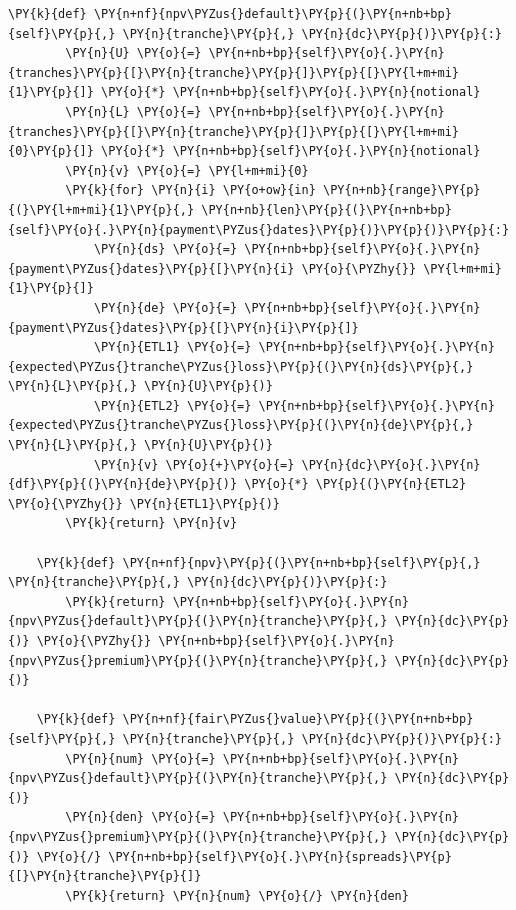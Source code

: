 \begin{codebox}
\begin{Verbatim}[commandchars=\\\{\}]
    \PY{k}{def} \PY{n+nf}{npv\PYZus{}default}\PY{p}{(}\PY{n+nb+bp}{self}\PY{p}{,} \PY{n}{tranche}\PY{p}{,} \PY{n}{dc}\PY{p}{)}\PY{p}{:}
        \PY{n}{U} \PY{o}{=} \PY{n+nb+bp}{self}\PY{o}{.}\PY{n}{tranches}\PY{p}{[}\PY{n}{tranche}\PY{p}{]}\PY{p}{[}\PY{l+m+mi}{1}\PY{p}{]} \PY{o}{*} \PY{n+nb+bp}{self}\PY{o}{.}\PY{n}{notional}
        \PY{n}{L} \PY{o}{=} \PY{n+nb+bp}{self}\PY{o}{.}\PY{n}{tranches}\PY{p}{[}\PY{n}{tranche}\PY{p}{]}\PY{p}{[}\PY{l+m+mi}{0}\PY{p}{]} \PY{o}{*} \PY{n+nb+bp}{self}\PY{o}{.}\PY{n}{notional}
        \PY{n}{v} \PY{o}{=} \PY{l+m+mi}{0}
        \PY{k}{for} \PY{n}{i} \PY{o+ow}{in} \PY{n+nb}{range}\PY{p}{(}\PY{l+m+mi}{1}\PY{p}{,} \PY{n+nb}{len}\PY{p}{(}\PY{n+nb+bp}{self}\PY{o}{.}\PY{n}{payment\PYZus{}dates}\PY{p}{)}\PY{p}{)}\PY{p}{:}
            \PY{n}{ds} \PY{o}{=} \PY{n+nb+bp}{self}\PY{o}{.}\PY{n}{payment\PYZus{}dates}\PY{p}{[}\PY{n}{i} \PY{o}{\PYZhy{}} \PY{l+m+mi}{1}\PY{p}{]} 
            \PY{n}{de} \PY{o}{=} \PY{n+nb+bp}{self}\PY{o}{.}\PY{n}{payment\PYZus{}dates}\PY{p}{[}\PY{n}{i}\PY{p}{]}
            \PY{n}{ETL1} \PY{o}{=} \PY{n+nb+bp}{self}\PY{o}{.}\PY{n}{expected\PYZus{}tranche\PYZus{}loss}\PY{p}{(}\PY{n}{ds}\PY{p}{,} \PY{n}{L}\PY{p}{,} \PY{n}{U}\PY{p}{)}
            \PY{n}{ETL2} \PY{o}{=} \PY{n+nb+bp}{self}\PY{o}{.}\PY{n}{expected\PYZus{}tranche\PYZus{}loss}\PY{p}{(}\PY{n}{de}\PY{p}{,} \PY{n}{L}\PY{p}{,} \PY{n}{U}\PY{p}{)}
            \PY{n}{v} \PY{o}{+}\PY{o}{=} \PY{n}{dc}\PY{o}{.}\PY{n}{df}\PY{p}{(}\PY{n}{de}\PY{p}{)} \PY{o}{*} \PY{p}{(}\PY{n}{ETL2} \PY{o}{\PYZhy{}} \PY{n}{ETL1}\PY{p}{)}
        \PY{k}{return} \PY{n}{v}
	
    \PY{k}{def} \PY{n+nf}{npv}\PY{p}{(}\PY{n+nb+bp}{self}\PY{p}{,} \PY{n}{tranche}\PY{p}{,} \PY{n}{dc}\PY{p}{)}\PY{p}{:}
        \PY{k}{return} \PY{n+nb+bp}{self}\PY{o}{.}\PY{n}{npv\PYZus{}default}\PY{p}{(}\PY{n}{tranche}\PY{p}{,} \PY{n}{dc}\PY{p}{)} \PY{o}{\PYZhy{}} \PY{n+nb+bp}{self}\PY{o}{.}\PY{n}{npv\PYZus{}premium}\PY{p}{(}\PY{n}{tranche}\PY{p}{,} \PY{n}{dc}\PY{p}{)}
	
    \PY{k}{def} \PY{n+nf}{fair\PYZus{}value}\PY{p}{(}\PY{n+nb+bp}{self}\PY{p}{,} \PY{n}{tranche}\PY{p}{,} \PY{n}{dc}\PY{p}{)}\PY{p}{:}
        \PY{n}{num} \PY{o}{=} \PY{n+nb+bp}{self}\PY{o}{.}\PY{n}{npv\PYZus{}default}\PY{p}{(}\PY{n}{tranche}\PY{p}{,} \PY{n}{dc}\PY{p}{)}
        \PY{n}{den} \PY{o}{=} \PY{n+nb+bp}{self}\PY{o}{.}\PY{n}{npv\PYZus{}premium}\PY{p}{(}\PY{n}{tranche}\PY{p}{,} \PY{n}{dc}\PY{p}{)} \PY{o}{/} \PY{n+nb+bp}{self}\PY{o}{.}\PY{n}{spreads}\PY{p}{[}\PY{n}{tranche}\PY{p}{]}
        \PY{k}{return} \PY{n}{num} \PY{o}{/} \PY{n}{den}
\end{Verbatim}
\end{codebox}


